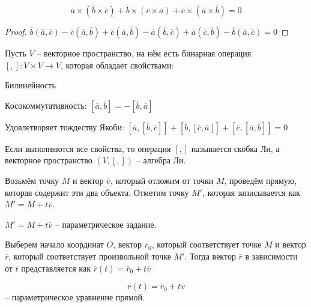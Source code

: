 	\begin{Thm}
		$$\overline{a} \times (\overline{b} \times \overline{c}) + \overline{b}\times(\overline{c} \times \overline{a}) + \overline{c} \times (\overline{a}\times \overline{b}) = 0$$
	\end{Thm}

	\begin{proof}
		$\overline{b}(\overline{a},\overline{c}) - \overline{c}(\overline{a}, \overline{b}) + \overline{c}(\overline{a}, \overline{b}) - \overline{a}(\overline{b}, \overline{c}) + \overline{a}(\overline{c}, \overline{b}) - \overline{b}(\overline{a}, \overline{c}) = 0$
	\end{proof}

	Пусть $V$ -- векторное пространство, на нём есть бинарная операция $[,]: V \times V \to V$, которая обладает свойствами:
	\begin{MyList}
		\item Билинейность
		\item Косокоммутативность: $[\overline{a}, \overline{b}] = -[\overline{b}, \overline{a}]$
		\item Удовлетворяет тождеству Якоби: $[\overline{a}, [\overline{b}, \overline{c}]] + [\overline{b}, [\overline{c}, \overline{a}]] + [\overline{c}, [\overline{a}, \overline{b}]] = 0$
	\end{MyList}
	
	\begin{Def}
		Если выполняются все свойства, то операция $[,]$ называется скобка Ли, а векторное пространство $(V, [,])$ -- алгебра Ли.
	\end{Def}


	Возьмём точку $M$ и вектор $\overline{v}$, который отложим от точки $M$, проведём прямую, которая содержит эти два объекта. Отметим точку $M'$, которая записывается как $M' = M + t \overline{v}$.  

	\begin{Def}
		$M' = M + t \overline{v}$ -- параметрическое задание. 
	\end{Def}

	Выберем начало координат $O$, вектор $\overline{r}_0$, который соответствует точке $M$ и вектор $\overline{r}$, который соответствует произвольной точке $M'$. Тогда вектор $\overline{r}$ в зависимости от $t$ представляется как $\overline{r}(t) = \overline{r}_0 + t \overline{v}$
	
	\begin{Def}
		$$\overline{r}(t) = \overline{r}_0 + t \overline{v}$$ -- параметрическое уравнение прямой.
	\end{Def}

